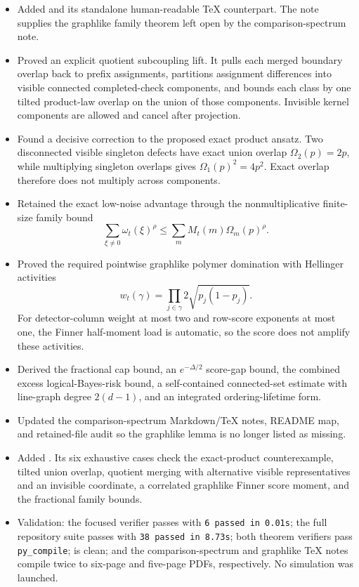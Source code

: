 \begin{itemize}
\item Added \texttt{} and its
standalone human-readable TeX counterpart. The note supplies the graphlike
family theorem left open by the comparison-spectrum note.
\item Proved an explicit quotient subcoupling lift. It pulls each merged
boundary overlap back to prefix assignments, partitions assignment
differences into visible connected completed-check components, and bounds
each class by one tilted product-law overlap on the union of those
components. Invisible kernel components are allowed and cancel after
projection.
\item Found a decisive correction to the proposed exact product ansatz. Two
disconnected visible singleton defects have exact union overlap
\(\Omega_2(p)=2p\), while multiplying singleton overlaps gives
\(\Omega_1(p)^2=4p^2\). Exact overlap therefore does not multiply across
components.
\item Retained the exact low-noise advantage through the nonmultiplicative
finite-size family bound
\[
 \sum_{\xi\ne0}\omega_t(\xi)^\rho
 \le \sum_m M_t(m)\Omega_m(p)^\rho.
\]
\item Proved the required pointwise graphlike polymer domination with
Hellinger activities
\[
 w_t(\gamma)=
 \prod_{j\in\gamma}2\sqrt{p_j(1-p_j)}.
\]
For detector-column weight at most two and row-score exponents at most one,
the Finner half-moment load is automatic, so the score does not amplify these
activities.
\item Derived the fractional cap bound, an \(e^{-\Delta/2}\) score-gap bound,
the combined excess logical-Bayes-risk bound, a self-contained connected-set
estimate with line-graph degree \(2(d-1)\), and an integrated
ordering-lifetime form.
\item Updated the comparison-spectrum Markdown/TeX notes, README map, and
retained-file audit so the graphlike lemma is no longer listed as missing.
\item Added
\texttt{}. Its six
exhaustive cases check the exact-product counterexample, tilted union overlap,
quotient merging with alternative visible representatives and an invisible
coordinate, a correlated graphlike Finner score moment, and the fractional
family bounds.
\item Validation: the focused verifier passes with \texttt{6 passed in
0.01s}; the full repository suite passes with \texttt{38 passed in 8.73s};
both theorem verifiers pass \texttt{py\_compile};
\texttt{} is clean; and the comparison-spectrum
and graphlike TeX notes compile twice to six-page and five-page PDFs,
respectively. No simulation was launched.
\end{itemize}

